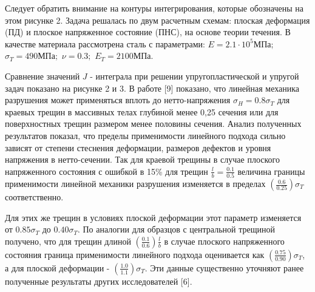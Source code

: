 \begin{multicols}{2}
Следует обратить внимание на контуры интегрирования, которые обозначены
на этом рисунке 2. Задача решалась по двум расчетным схемам: плоская
деформация (ПД) и плоское напряженное состояние (ПНС), на основе теории
течения. В качестве материала рассмотрена сталь с параметрами:
$E = 2.1 \cdot 10^{5} \text{МПа;}$ $\sigma_{T} = 490 \text{МПа};$ $\nu = 0.3;$ $E_{T} = 2100 \text{МПа}.$

Сравнение значений $J$ - интеграла при
решении упругопластической и упругой задач показано на рисунке 2 и 3. В
работе {[}9{]} показано, что линейная механика разрушения может
применяться вплоть до нетто-напряжения
$\sigma_{H} = 0.8 \sigma_{T}$ для краевых трещин в массивных телах
глубиной менее 0,25 сечения или для поверхностных трещин размером менее
половины сечения. Анализ полученных результатов показал, что пределы
применимости линейного подхода сильно зависят от степени стеснения
деформации, размеров дефектов и уровня напряжения в нетто-сечении. Так
для краевой трещины в случае плоского напряженного состояния с ошибкой в
15\% для трещин $\frac{l}{b} = \frac{0.1}{0.5}$ величина границы
применимости линейной механики разрушения изменяется в пределах
$\left( \frac{0.6}{0.25} \right) \sigma_{T}$ соответственно.

Для этих же трещин в условиях плоской деформации этот параметр
изменяется от $0.85 \sigma_{T}$ до
$0.40 \sigma_{T}$. По аналогии для образцов с
центральной трещиной получено, что для трещин длиной
$\left( \frac{0.1}{0.6} \right) \frac{l}{b}$ в случае плоского напряженного
состояния граница применимости линейного подхода оценивается как
$\left( \frac{0.75}{0.90} \right) \sigma_{T}$, а для плоской деформации -
$\left( \frac{1.0}{1.1} \right) \sigma_{T}$. Эти данные существенно уточняют
ранее полученные результаты других исследователей {[}6{]}.
\end{multicols}

